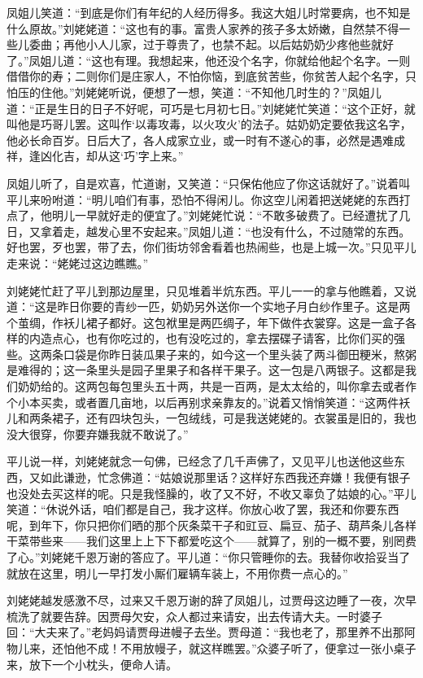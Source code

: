 \documentclass[12pt,oneside]{book}
\begin{document}
凤姐儿笑道：“到底是你们有年纪的人经历得多。我这大姐儿时常要病，也不知是什么原故。”刘姥姥道：“这也有的事。富贵人家养的孩子多太娇嫩，自然禁不得一些儿委曲；再他小人儿家，过于尊贵了，也禁不起。以后姑奶奶少疼他些就好了。”凤姐儿道：“这也有理。我想起来，他还没个名字，你就给他起个名字。一则借借你的寿；二则你们是庄家人，不怕你恼，到底贫苦些，你贫苦人起个名字，只怕压的住他。”刘姥姥听说，便想了一想，笑道：“不知他几时生的？”凤姐儿道：“正是生日的日子不好呢，可巧是七月初七日。”刘姥姥忙笑道：“这个正好，就叫他是巧哥儿罢。这叫作‘以毒攻毒，以火攻火’的法子。姑奶奶定要依我这名字，他必长命百岁。日后大了，各人成家立业，或一时有不遂心的事，必然是遇难成祥，逢凶化吉，却从这‘巧’字上来。”

凤姐儿听了，自是欢喜，忙道谢，又笑道：“只保佑他应了你这话就好了。”说着叫平儿来吩咐道：“明儿咱们有事，恐怕不得闲儿。你这空儿闲着把送姥姥的东西打点了，他明儿一早就好走的便宜了。”刘姥姥忙说：“不敢多破费了。已经遭扰了几日，又拿着走，越发心里不安起来。”凤姐儿道：“也没有什么，不过随常的东西。好也罢，歹也罢，带了去，你们街坊邻舍看着也热闹些，也是上城一次。”只见平儿走来说：“姥姥过这边瞧瞧。”

刘姥姥忙赶了平儿到那边屋里，只见堆着半炕东西。平儿一一的拿与他瞧着，又说道：“这是昨日你要的青纱一匹，奶奶另外送你一个实地子月白纱作里子。这是两个茧绸，作袄儿裙子都好。这包袱里是两匹绸子，年下做件衣裳穿。这是一盒子各样的内造点心，也有你吃过的，也有没吃过的，拿去摆碟子请客，比你们买的强些。这两条口袋是你昨日装瓜果子来的，如今这一个里头装了两斗御田粳米，熬粥是难得的；这一条里头是园子里果子和各样干果子。这一包是八两银子。这都是我们奶奶给的。这两包每包里头五十两，共是一百两，是太太给的，叫你拿去或者作个小本买卖，或者置几亩地，以后再别求亲靠友的。”说着又悄悄笑道：“这两件袄儿和两条裙子，还有四块包头，一包绒线，可是我送姥姥的。衣裳虽是旧的，我也没大很穿，你要弃嫌我就不敢说了。”

平儿说一样，刘姥姥就念一句佛，已经念了几千声佛了，又见平儿也送他这些东西，又如此谦逊，忙念佛道：“姑娘说那里话？这样好东西我还弃嫌！我便有银子也没处去买这样的呢。只是我怪臊的，收了又不好，不收又辜负了姑娘的心。”平儿笑道：“休说外话，咱们都是自己，我才这样。你放心收了罢，我还和你要东西呢，到年下，你只把你们晒的那个灰条菜干子和豇豆、扁豆、茄子、葫芦条儿各样干菜带些来——我们这里上上下下都爱吃这个——就算了，别的一概不要，别罔费了心。”刘姥姥千恩万谢的答应了。平儿道：“你只管睡你的去。我替你收拾妥当了就放在这里，明儿一早打发小厮们雇辆车装上，不用你费一点心的。”

刘姥姥越发感激不尽，过来又千恩万谢的辞了凤姐儿，过贾母这边睡了一夜，次早梳洗了就要告辞。因贾母欠安，众人都过来请安，出去传请大夫。一时婆子回：“大夫来了。”老妈妈请贾母进幔子去坐。贾母道：“我也老了，那里养不出那阿物儿来，还怕他不成！不用放幔子，就这样瞧罢。”众婆子听了，便拿过一张小桌子来，放下一个小枕头，便命人请。
\end{document}
